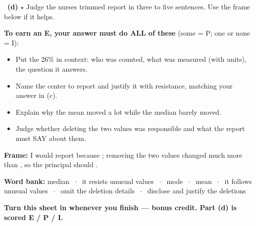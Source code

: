 \documentclass[11pt]{article}
\begin{document}
~\textbf{(d)} $\star$ Judge the nurse\textquotesingle s trimmed report in three to five sentences. Use the frame below if it helps.\par
{\small\textbf{To earn an E, your answer must do ALL of these} (some = P; one or none = I):
\begin{itemize}[leftmargin=1.6em,itemsep=0pt,topsep=1pt,parsep=0pt]
  \item[{\setlength{\fboxsep}{0pt}\fbox{\rule{0pt}{0.65em}\hspace{0.65em}}}] Put the 26\% in context: who was counted, what was measured (with units), the question it answers.
  \item[{\setlength{\fboxsep}{0pt}\fbox{\rule{0pt}{0.65em}\hspace{0.65em}}}] Name the center to report and justify it with resistance, matching your answer in (c).
  \item[{\setlength{\fboxsep}{0pt}\fbox{\rule{0pt}{0.65em}\hspace{0.65em}}}] Explain why the mean moved a lot while the median barely moved.
  \item[{\setlength{\fboxsep}{0pt}\fbox{\rule{0pt}{0.65em}\hspace{0.65em}}}] Judge whether deleting the two values was responsible and what the report must SAY about them.
\end{itemize}}
\begin{sentenceframebox}[top=3pt,bottom=3pt,before skip=4pt,after skip=4pt]\raggedright\textbf{Frame:} I would report  because ; removing the two values changed  much more than , so the principal should .\end{sentenceframebox}

\begin{wordbankbox}[top=3pt,bottom=3pt,before skip=4pt,after skip=4pt]\small\raggedright
\textbf{Word bank:} median \ensuremath{\;\cdot\;} it resists unusual values \ensuremath{\;\cdot\;} mode \ensuremath{\;\cdot\;} mean \ensuremath{\;\cdot\;} it follows unusual values \ensuremath{\;\cdot\;} omit the deletion details \ensuremath{\;\cdot\;} disclose and justify the deletions
\end{wordbankbox}



\textbf{Turn this sheet in whenever you finish --- bonus credit. Part (d) is scored E / P / I.}\par

\twopageguard
\end{document}
